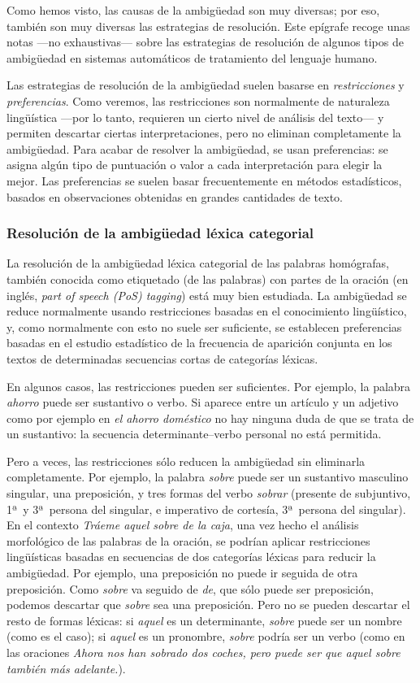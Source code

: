 Como hemos visto, las causas de la ambigüedad son muy diversas; por eso, también son muy diversas las estrategias de resolución. Este epígrafe recoge unas notas ---no exhaustivas--- sobre las estrategias de resolución de algunos tipos de ambigüedad en sistemas automáticos de tratamiento del lenguaje humano. 

Las estrategias de resolución de la ambigüedad suelen basarse en \emph{restricciones} y \emph{preferencias}. Como veremos, las restricciones son normalmente de naturaleza lingüística ---por lo tanto, requieren un cierto nivel de análisis del texto--- y permiten descartar ciertas interpretaciones, pero no eliminan completamente la ambigüedad. Para acabar de resolver la ambigüedad, se usan preferencias: se asigna algún tipo de puntuación o valor a cada interpretación para elegir la mejor. Las preferencias se suelen basar frecuentemente en métodos estadísticos, basados en observaciones obtenidas en grandes cantidades de texto. 

\subsubsection{Resolución de la ambigüedad léxica categorial} \label{s3:reshom} La resolución de la ambigüedad léxica categorial de las palabras homógrafas, también conocida como etiquetado (de las palabras) con partes de la oración (en inglés, \emph{part of speech (PoS) tagging}) está muy bien estudiada. La ambigüedad se reduce normalmente usando restricciones basadas en el conocimiento lingüístico, y, como normalmente con esto no suele ser suficiente, se establecen preferencias basadas en el estudio estadístico de la frecuencia de aparición conjunta en los textos de determinadas secuencias cortas de categorías léxicas. 

En algunos casos, las restricciones pueden ser suficientes. Por ejemplo, la palabra \emph{ahorro} puede ser sustantivo o verbo. Si aparece entre un artículo y un adjetivo como por ejemplo en \emph{el ahorro doméstico} no hay ninguna duda de que se trata de un sustantivo: la secuencia determinante--verbo personal no está permitida. 

Pero a veces, las restricciones sólo reducen la ambigüedad sin eliminarla completamente. Por ejemplo, la palabra \emph{sobre} puede ser un sustantivo masculino singular, una preposición, y tres formas del verbo \emph{sobrar} (presente de subjuntivo, 1ª\ y 3ª\ persona del singular, e imperativo de cortesía, 3ª\ persona del singular). En el contexto \emph{Tráeme aquel sobre de la caja}, una vez hecho el análisis morfológico de las palabras de la oración, se podrían aplicar restricciones lingüísticas basadas en secuencias de dos categorías léxicas para reducir la ambigüedad. Por ejemplo, una preposición no puede ir seguida de otra preposición. Como \emph{sobre} va seguido de \emph{de}, que sólo puede ser preposición, podemos descartar que \emph{sobre} sea una preposición. Pero no se pueden descartar el resto de formas léxicas: si \emph{aquel} es un determinante, \emph{sobre} puede ser un nombre (como es el caso); si \emph{aquel} es un pronombre, \emph{sobre} podría ser un verbo (como en las oraciones \emph{Ahora nos han sobrado dos coches, pero puede ser que aquel sobre también más adelante.}). 


